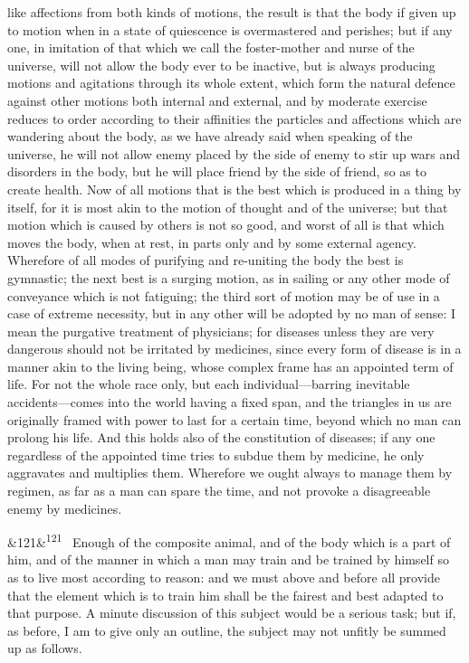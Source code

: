 \documentclass[12pt]{article}
\newcommand{\para}[1][]{\par\noindent\ifx&#1&\else\textsuperscript{\footnotesize #1}~\fi}
\begin{document}
like affections from both kinds of motions, the result is that the body if given up to motion when in a state of quiescence is overmastered and perishes; but if any one, in imitation of that which we call the foster-mother and nurse of the universe, will not allow the body ever to be inactive, but is always producing motions and agitations through its whole extent, which form the natural defence against other motions both internal and external, and by moderate exercise reduces to order according to their affinities the particles and affections which are wandering about the body, as we have already said when speaking of the universe, he will not allow enemy placed by the side of enemy to stir up wars and disorders in the body, but he will place friend by the side of friend, so as to create health. Now of all motions that is the best which is produced in a thing by itself, for it is most akin to the motion of thought and of the universe; but that motion which is caused by others is not so good, and worst of all is that which moves the body, when at rest, in parts only and by some external agency. Wherefore of all modes of purifying and re-uniting the body the best is gymnastic; the next best is a surging motion, as in sailing or any other mode of conveyance which is not fatiguing; the third sort of motion may be of use in a case of extreme necessity, but in any other will be adopted by no man of sense: I mean the purgative treatment of physicians; for diseases unless they are very dangerous should not be irritated by medicines, since every form of disease is in a manner akin to the living being, whose complex frame has an appointed term of life. For not the whole race only, but each individual---barring inevitable accidents---comes into the world having a fixed span, and the triangles in us are originally framed with power to last for a certain time, beyond which no man can prolong his life. And this holds also of the constitution of diseases; if any one regardless of the appointed time tries to subdue them by medicine, he only aggravates and multiplies them. Wherefore we ought always to manage them by regimen, as far as a man can spare the time, and not provoke a disagreeable enemy by medicines.

\para[121] Enough of the composite animal, and of the body which is a part of him, and of the manner in which a man may train and be trained by himself so as to live most according to reason: and we must above and before all provide that the element which is to train him shall be the fairest and best adapted to that purpose. A minute discussion of this subject would be a serious task; but if, as before, I am to give only an outline, the subject may not unfitly be summed up as follows.
\end{document}
